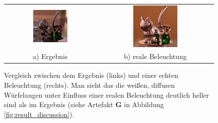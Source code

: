    \begin{figure}[h]
    \centering
    \begin{tabular}{cc}
     \includegraphics[width=0.40\textwidth]{../graphics/ergebnisse/result_all_extended_small.jpg} 
    &
     \includegraphics[width=0.40\textwidth]{../graphics/ergebnisse/cat_compare_small.jpg}
    \\ 
    a) Ergebnis & b) reale Beleuchtung \\
    \end{tabular}
    \caption[Ergebnis: Szene 1 (Vergleich) ]{ Vergleich zwischen dem Ergebnis (links) und einer echten Beleuchtung (rechts).
      Man sieht das die weißen, diffusen Würfelaugen unter Einfluss einer realen Beleuchtung deutlich heller sind als im Ergebnis (siehe Artefakt \textbf{G} in Abbildung \ref{fig:result_discussion}). }

    \label{fig:result_comparison}
   \end{figure}

